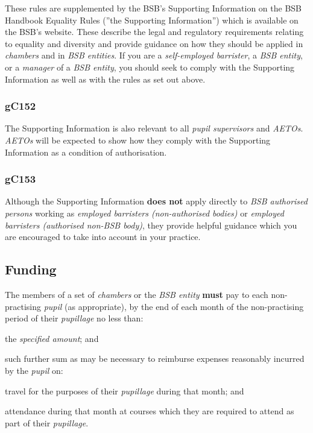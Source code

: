 These rules are supplemented by the BSB's Supporting Information on the
BSB Handbook Equality Rules (''the Supporting Information'') which is
available on the BSB's website. These describe the legal and regulatory
requirements relating to equality and diversity and provide guidance on
how they should be applied in \emph{chambers} and in \emph{BSB
entities}. If you are a \emph{self-employed barrister}, a \emph{BSB
entity}, or a \emph{manager} of a \emph{BSB entity}, you should seek to
comply with the Supporting Information as well as with the rules as set
out above.

\subsubsection{\color{darkgrey}gC152}

The Supporting Information is also relevant to all \emph{pupil
supervisors} and \emph{AETOs}. \emph{AETOs} will be expected to show how
they comply with the Supporting Information as a condition of
authorisation.

\subsubsection{\color{darkgrey}gC153}

Although the Supporting Information \textcolor{myred}{\textbf{does not}} apply directly to \emph{BSB
authorised persons} working as \emph{employed barristers (non-authorised
bodies)} or \emph{employed barristers (authorised non-BSB body)}, they
provide helpful guidance which you are encouraged to take into account
in your practice.



\subsection{Funding}


The members of a set of \emph{chambers} or the \emph{BSB entity} \textcolor{myred}{\textbf{must}}
pay to each non-practising \emph{pupil} (as appropriate), by the end of
each month of the non-practising period of their \emph{pupillage} no
less than:
\begin{numlist}\item the \emph{specified amount}; and
\item such further sum as may be necessary to reimburse expenses reasonably
incurred by the \emph{pupil} on:
\item travel for the purposes of their \emph{pupillage} during that month;
and
\item attendance during that month at courses which they are required to
attend as part of their \emph{pupillage}.
\end{numlist}

